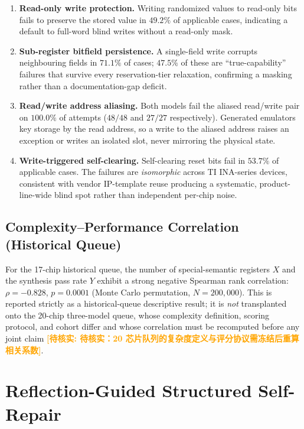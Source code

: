 \documentclass[preprint,review]{elsarticle}
\theoremstyle{definition}
\newcommand{\unverified}[1]{\textcolor{orange}{\textbf{[待核实: #1]}}}
\begin{document}
\begin{enumerate}
\item \textbf{Read-only write protection.} Writing randomized values to read-only bits
fails to preserve the stored value in $49.2\%$ of applicable cases, indicating a default to
full-word blind writes without a read-only mask.
\item \textbf{Sub-register bitfield persistence.} A single-field write corrupts neighbouring
fields in $71.1\%$ of cases; $47.5\%$ of these are ``true-capability'' failures that survive
every reservation-tier relaxation, confirming a masking rather than a documentation-gap
deficit.
\item \textbf{Read/write address aliasing.} Both models fail the aliased read/write pair on
$100.0\%$ of attempts ($48/48$ and $27/27$ respectively). Generated emulators key storage by
the read address, so a write to the aliased address raises an exception or writes an isolated
slot, never mirroring the physical state.
\item \textbf{Write-triggered self-clearing.} Self-clearing reset bits fail in $53.7\%$ of
applicable cases. The failures are \emph{isomorphic} across TI INA-series devices, consistent
with vendor IP-template reuse producing a systematic, product-line-wide blind spot rather
than independent per-chip noise.
\end{enumerate}

\subsection{Complexity--Performance Correlation (Historical Queue)}
\label{sec:complexity}

For the 17-chip historical queue, the number of special-semantic registers $X$ and the
synthesis pass rate $Y$ exhibit a strong negative Spearman rank correlation:
$\rho=-0.828$, $p=0.0001$ (Monte Carlo permutation, $N=200{,}000$). This is reported strictly
as a historical-queue descriptive result; it is \emph{not} transplanted onto the 20-chip
three-model queue, whose complexity definition, scoring protocol, and cohort differ and whose
correlation must be recomputed before any joint claim \unverified{待核实：20 芯片队列的复杂度定义与评分协议需冻结后重算相关系数}.

\section{Reflection-Guided Structured Self-Repair}
\label{sec:self-repair}
\end{document}
